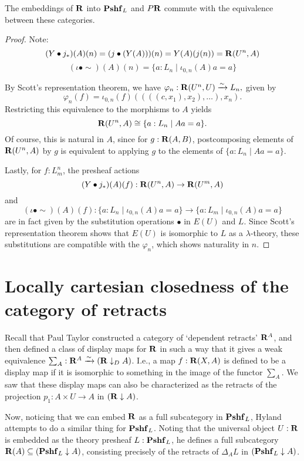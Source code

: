 \begin{lemma}
  The embeddings of $ \mathbf{R} $ into $ \mathbf{Pshf}_{L} $ and $ P \mathbf{R} $ commute with the equivalence between these categories.
\end{lemma}
\begin{proof}
  Note:
  \[ (Y \bullet j_*)(A)(n) = (j \bullet (Y(A)))(n) = Y(A)(j(n)) = \mathbf{R}(U^n, A) \]
  \[ (\iota \bullet \sim)(A)(n) = \{ a : L_n \mid \iota_{0, n}(A) a = a \} \]

  By Scott's representation theorem, we have $ \varphi_n: \mathbf{R}(U^n, U) \xrightarrow \sim L_n, $ given by
  \[ \varphi_n(f) = \iota_{0, n}(f) ((((c, x_1), x_2), \dots), x_n). \]
  Restricting this equivalence to the morphisms to $ A $ yields
  \[ \mathbf{R}(U^n, A) \cong \{ a : L_n \mid A a = a \}. \]
  Of course, this is natural in $ A $, since for $ g: \mathbf{R}(A, B) $, postcomposing elements of $ \mathbf{R}(U^n, A) $ by $ g $ is equivalent to applying $ g $ to the elements of $ \{ a : L_n \mid A a = a \} $.

  Lastly, for $ f : L_m^n $, the presheaf actions
  \[ (Y \bullet j_*)(A)(f) : \mathbf{R}(U^n, A) \to \mathbf{R}(U^m, A) \]
  and
  \[ (\iota \bullet \sim)(A)(f) : \{ a : L_n \mid \iota_{0, n}(A) a = a \} \to \{ a : L_m \mid \iota_{0, n}(A) a = a \} \]
  are in fact given by the substitution operations $ \bullet $ in $ E(U) $ and $ L $. Since Scott's representation theorem shows that $ E(U) $ is isomorphic to $ L $ as a $ \lambda $-theory, these substitutions are compatible with the $ \varphi_n $, which shows naturality in $ n $.
\end{proof}

\section{Locally cartesian closedness of the category of retracts}

Recall that Paul Taylor constructed a category of `dependent retracts' $ \mathbf{R}^A $, and then defined a class of display maps for $ \mathbf{R} $ in such a way that it gives a weak equivalence $ \sum_A : \mathbf{R}^A \xrightarrow{\sim} (\mathbf{R} \downarrow_D A) $. I.e., a map $ f: \mathbf{R}(X, A) $ is defined to be a display map if it is isomorphic to something in the image of the functor $ \sum_A $. We saw that these display maps can also be characterized as the retracts of the projection $ p_1: A \times U \to A $ in $ (\mathbf{R} \downarrow A) $.

Now, noticing that we can embed $ \mathbf{R} $ as a full subcategory in $ \mathbf{Pshf}_{L} $, Hyland attempts to do a similar thing for $ \mathbf{Pshf}_{L} $. Noting that the universal object $ U : \mathbf{R} $ is embedded as the theory presheaf $ L : \mathbf{Pshf}_{L} $, he defines a full subcategory $ \mathbf{R}(A) \subseteq (\mathbf{Pshf}_{L} \downarrow A) $, consisting precisely of the retracts of $ \Delta_A L $ in $ (\mathbf{Pshf}_{L} \downarrow A) $.

